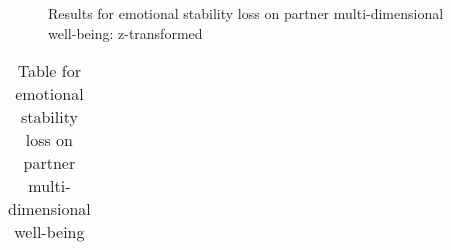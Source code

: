\documentclass[
  singlecolumn]{article}
\begin{document}
\begin{figure}


\caption{\label{fig-results-emotional-loss}Results for emotional
stability loss on partner multi-dimensional well-being: z-transformed}

\end{figure}%

\newpage{}

\begin{longtable}[]{@{}
  >{\raggedright\arraybackslash}p{}
  >{\raggedleft\arraybackslash}p{}
  >{\raggedleft\arraybackslash}p{}
  >{\raggedleft\arraybackslash}p{}
  >{\raggedleft\arraybackslash}p{}
  >{\raggedleft\arraybackslash}p{}@{}}

\caption{\label{tbl-results-emotional-loss}Table for emotional stability
loss on partner multi-dimensional well-being}

\tabularnewline


\end{longtable}
\end{document}

